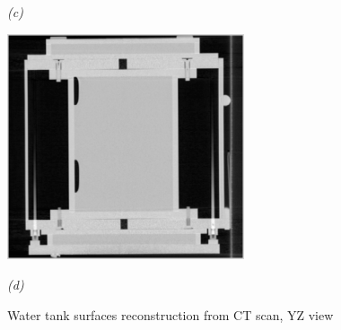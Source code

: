 \begin{figure}[htb]
\begin{minipage}[b]{2.75in}
    \centerline{\emph{(c)}}
  \end{minipage}\medskip
  \begin{minipage}[b]{2.75in}
    \centering
    \centerline{\mbox{\includegraphics[width=2.75in]{data_extraction/images/surface_plane/saggital_ct_tilt.eps}}}
    \centerline{\emph{(d)}}
  \end{minipage}
  
  \caption{Water tank surfaces reconstruction from CT scan, YZ view}
  \label{fig:ct_tank_surface_reconstruction_yz}

\end{figure}


